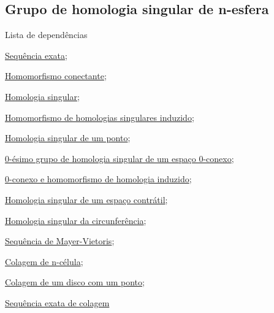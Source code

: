 \subsection{Grupo de homologia singular de n-esfera} %
\label{grupo-de-homologia-singular-de-n-esfera-prop}
\begin{titlemize}{Lista de dependências}
    \item \hyperref[sequencia-exata-def]{Sequência exata};\\
    \item \hyperref[homomorfismo-conectante-def]{Homomorfismo conectante};\\
    \item \hyperref[homologia-singular-def]{Homologia singular};\\
    \item \hyperref[homomorfismo-de-homologias-singulares-induzido-prop]{Homomorfismo de homologias singulares induzido};\\
    \item \hyperref[homologia-singular-de-um-ponto-prop]{Homologia singular de um ponto};\\
    \item \hyperref[0-esimo-grupo-de-homologia-de-espaco-zero-conexo-prop]{0-ésimo grupo de homologia singular de um espaço 0-conexo};\\
    \item \hyperref[0-conexo-e-homomorfismo-de-homologia-induzido-prop]{0-conexo e homomorfismo de homologia induzido};\\
    \item \hyperref[homologia-singular-de-um-espaco-contratil-prop]{Homologia singular de um espaço contrátil};\\
    \item \hyperref[homologia-singular-de-S1-prop]{Homologia singular da circunferência};\\
    \item \hyperref[sequencia-de-mayer-vietoris-prop]{Sequência de Mayer-Vietoris};\\
    \item \hyperref[colagem-de-n-celula-def]{Colagem de n-célula};\\
    \item \hyperref[colagem-de-um-disco-com-um-ponto-ex]{Colagem de um disco com um ponto};\\
    \item \hyperref[sequencia-exata-da-colagem-prop]{Sequência exata de colagem}
\end{titlemize}

